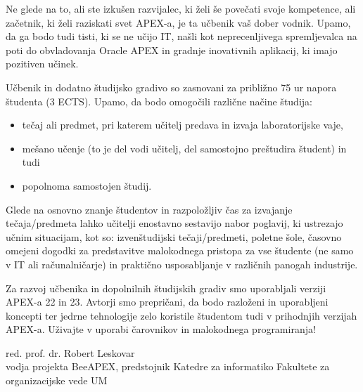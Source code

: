 \noindent Ne glede na to, ali ste izkušen razvijalec, ki želi še povečati svoje kompetence, ali začetnik, ki želi raziskati svet APEX-a, je ta učbenik vaš dober vodnik. Upamo, da ga bodo tudi tisti, ki se ne učijo IT, našli kot neprecenljivega spremljevalca na poti do obvladovanja Oracle APEX in gradnje inovativnih aplikacij, ki imajo pozitiven učinek. 

\vspace{0.5cm}
\noindent Učbenik in dodatno študijsko gradivo so zasnovani za približno 75 ur napora študenta (3 ECTS). Upamo, da bodo omogočili različne načine študija:
\begin{itemize}
	\item tečaj ali predmet, pri katerem učitelj predava in izvaja laboratorijske vaje,
	\item mešano učenje (to je del vodi učitelj, del samostojno preštudira študent) in tudi
	\item popolnoma samostojen študij.
\end{itemize}

\noindent Glede na osnovno znanje študentov in razpoložljiv čas za izvajanje tečaja/predmeta lahko učitelji enostavno sestavijo nabor poglavij, ki ustrezajo učnim situacijam, kot so: izvenštudijski tečaji/predmeti, poletne šole, časovno omejeni dogodki za predstavitve malokodnega pristopa za vse študente (ne samo v IT ali računalničarje) in praktično usposabljanje v različnih panogah industrije.

\vspace{0.5cm}
\noindent Za razvoj učbenika in dopolnilnih študijskih gradiv smo uporabljali verziji APEX-a 22 in 23. Avtorji smo prepričani, da bodo razloženi in uporabljeni koncepti ter jedrne tehnologije zelo koristile študentom tudi v prihodnjih verzijah APEX-a.
\newline
\vspace{1cm}
\noindent Uživajte v uporabi čarovnikov in malokodnega programiranja!
\newline

\vspace{1cm}
\noindent red. prof. dr. Robert Leskovar\\
vodja projekta BeeAPEX, predstojnik Katedre za informatiko Fakultete za organizacijske vede UM

